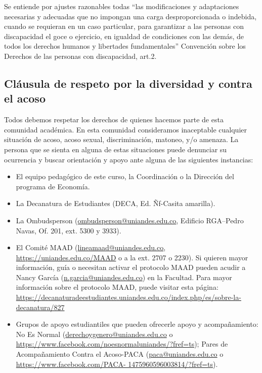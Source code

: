 \documentclass[11pt]{article}
\begin{document}
Se entiende por ajustes razonables todas ``las modificaciones y adaptaciones necesarias y adecuadas que no impongan una carga desproporcionada o indebida, cuando se requieran en un caso particular, para garantizar a las personas con discapacidad el goce o ejercicio, en igualdad de condiciones con las demás, de todos los derechos humanos y libertades fundamentales'' Convención sobre los Derechos de las personas con discapacidad, art.2.


\subsection*{Cláusula de respeto por la diversidad y contra el acoso}

Todos debemos respetar los derechos de quienes hacemos parte de esta comunidad académica. En esta comunidad consideramos inaceptable cualquier situación de acoso, acoso sexual, discriminación, matoneo, y/o amenaza.
La persona que se sienta en alguna de estas situaciones puede denunciar su ocurrencia y buscar orientación y apoyo ante alguna de las siguientes instancias:
\begin{itemize}
\item El equipo pedagógico de este curso, la Coordinación o la Dirección del programa de Economía. 
\item La Decanatura de Estudiantes (DECA, Ed. Ñf-Casita amarilla).
\item La Ombudsperson (\href{mailto:ombudsperson@uniandes.edu.co}{ombudsperson@uniandes.edu.co}, Edificio RGA–Pedro Navas, Of. 201, ext. 5300 y 3933).
\item El Comité MAAD (\href{mailto:lineamaad@uniandes.edu.co}{lineamaad@uniandes.edu.co}, \url{https://uniandes.edu.co/MAAD} o a la ext. 2707 o 2230). Si quieren mayor información, guía o necesitan activar el protocolo MAAD pueden acudir a Nancy García (\href{mailto:n.garcia@uniandes.edu.co}{n.garcia@uniandes.edu.co}) en la Facultad. Para mayor información sobre el protocolo MAAD, puede visitar esta página: \url{https://decanaturadeestudiantes.uniandes.edu.co/index.php/es/sobre-la-decanatura/827}
\item Grupos de apoyo estudiantiles que pueden ofrecerle apoyo y acompañamiento: No Es Normal (\href{mailto:derechoygenero@uniandes.edu.co}{derechoygenero@uniandes.edu.co} o \url{https://www.facebook.com/noesnormaluniandes/?fref=ts}); Pares de Acompañamiento Contra el Acoso-PACA (\href{mailto:paca@uniandes.edu.co}{paca@uniandes.edu.co} o \url{https://www.facebook.com/PACA- 1475960596003814/?fref=ts}).
\end{itemize}
\end{document}
